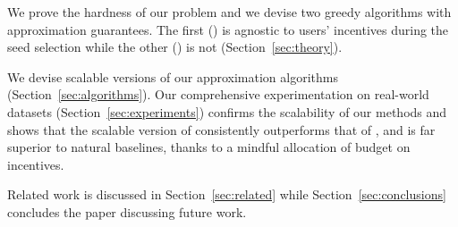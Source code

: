 
\item We prove the hardness of our problem and we devise two greedy algorithms with approximation guarantees. The first (\CARM) is agnostic to users' incentives during the seed selection while the other (\CSRM) is not (Section~\ref{sec:theory}). %

\item We devise scalable versions of our approximation algorithms (Section~\ref{sec:algorithms}). Our comprehensive experimentation on real-world datasets (Section~\ref{sec:experiments}) confirms the scalability of our methods and shows that the scalable version of \CSRM consistently outperforms that of \CARM, and is far superior to natural baselines, thanks to a mindful allocation of budget on incentives. 

\squishend
Related work is discussed in Section~\ref{sec:related} while Section~\ref{sec:conclusions} concludes the paper discussing future work.




